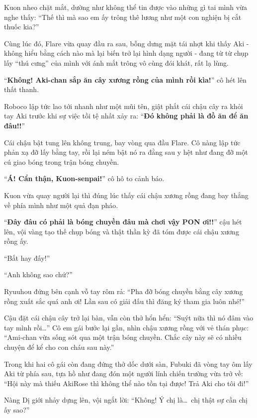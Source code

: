 \documentclass[../main.tex]{subfiles}
\begin{document}
Kuon nheo chặt mắt, dường như không thể tin được vào những gì tai mình vừa nghe thấy: ``Thế thì mà sao em ấy trông thê lương như một con nghiện bị cắt thuốc kia?''

Cùng lúc đó, Flare vừa quay đầu ra sau, bỗng dưng mặt tái nhợt khi thấy Aki - không hiểu bằng cách nào mà lại biến trở lại hình dạng người - đang từ từ chụp lấy ``thú cưng'' của mình với ánh mắt trông vô cùng đói khát, rất lạ lùng.


``\textbf{Không! Aki-chan sắp ăn cây xương rồng của mình rồi kìa!}'' cô hét lên thất thanh.

Roboco lập tức lao tới nhanh như một mũi tên, giật phắt cái chậu cây ra khỏi tay Aki trước khi sự việc tồi tệ nhất xảy ra: ``\textbf{Đó không phải là đồ ăn để ăn đâu!!}''

Cái chậu bật tung lên không trung, bay vòng qua đầu Flare. Cô nàng lập tức phản xạ đỡ lấy bằng tay, rồi lại ném bật nó ra đằng sau y hệt như đang đỡ một cú giao bóng trong trận bóng chuyền.

``\textbf{Á! Cẩn thận, Kuon-senpai!}'' cô hô to cảnh báo.

Kuon vừa quay người lại thì đúng lúc thấy cái chậu xương rồng đang bay thẳng về phía mình như một quả đạn pháo.

``\textbf{Đây đâu có phải là bóng chuyền đâu mà chơi vậy PON ơi!!}'' cậu hét lên, vội vàng tạo thế chụp bóng và thật thần kỳ đã tóm được cái chậu xương rồng ấy.

``Bắt hay đấy!''

``Anh không sao chứ?''

Ryuuhou đứng bên cạnh vỗ tay rôm rả: ``Pha đỡ bóng chuyền bằng cây xương rồng xuất sắc quá anh ơi! Lần sau có giải đấu thì đăng ký tham gia luôn nhé!''

Cậu đặt cái chậu cây trở lại bàn, vẫn còn thở hổn hển: ``Suýt nữa thì nó đâm vào tay mình rồi\dots'' Cô em gái bước lại gần, nhìn chậu xương rồng với vẻ thán phục: ``Ami-chan vừa sống sót qua một trận bóng chuyền. Chắc cây này sẽ có nhiều chuyện để kể cho con cháu sau này.''

Trong khi hai cô gái còn đang đứng thở dốc dưới sàn, Fubuki đã vòng tay ôm lấy Aki từ phía sau, tựa hồ như đang đón một người lính chiến trường vừa trở về: ``Hội này mà thiếu AkiRose thì không thể nào tồn tại được! Trả Aki cho tôi đi!''

Nàng Dị giới nhảy dựng lên, vội ngắt lời: ``Không! Ý chị là\dots\ chị thật sự cần chị ấy sao?''
\end{document}

